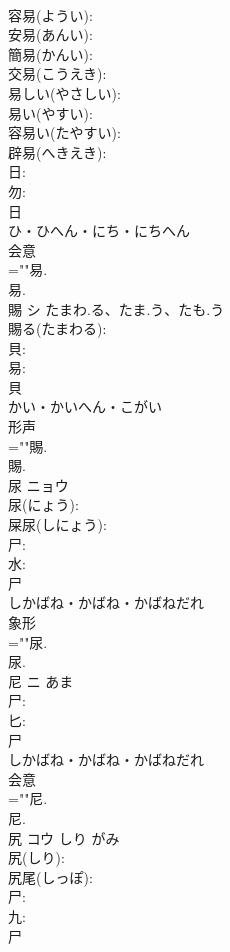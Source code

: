 \documentclass[8pt]{extreport}
\begin{document}
\begin{CJK}{UTF8}{min}
\\	容易(ようい): 
\\	安易(あんい): 
\\	簡易(かんい): 
\\	交易(こうえき): 
\\	易しい(やさしい): 
\\	易い(やすい): 
\\	容易い(たやすい): 
\\	辟易(へきえき): 
\\	日: 
\\	勿: 
\\	日	
\\	ひ・ひへん・にち・にちへん	
\\	会意 
\\	=""易.
\\	易.
\\	賜	シ	たまわ.る、たま.う、たも.う		
\\	賜る(たまわる): 
\\	貝: 
\\	易: 
\\	貝	
\\	かい・かいへん・こがい	
\\	形声 
\\	=""賜.
\\	賜.
\\	尿	ニョウ			
\\	尿(にょう): 
\\	屎尿(しにょう): 
\\	尸: 
\\	水: 
\\	尸	
\\	しかばね・かばね・かばねだれ	
\\	象形 
\\	=""尿.
\\	尿.
\\	尼	ニ	あま		
\\	尸: 
\\	匕: 
\\	尸	
\\	しかばね・かばね・かばねだれ	
\\	会意 
\\	=""尼.
\\	尼.
\\	尻	コウ	しり	がみ	
\\	尻(しり): 
\\	尻尾(しっぽ): 
\\	尸: 
\\	九: 
\\	尸	

\end{CJK}
\end{document}
